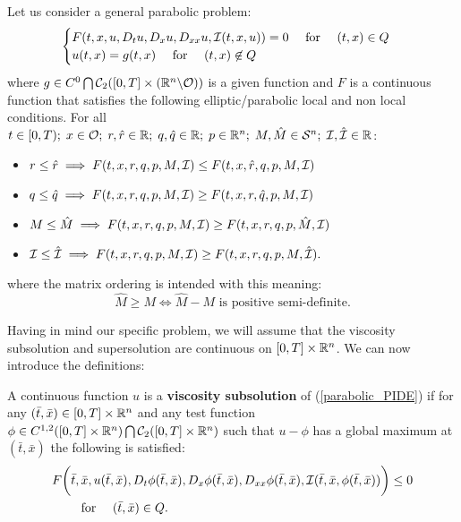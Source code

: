 Let us consider a general parabolic problem:
\begin{equation}\label{parabolic_PIDE}
\begin{cases}
F(t,x,u,D_t u,D_x u,D_{xx}u,\mathcal{I}(t,x,u)) = 0 \quad \mbox{ for } \quad (t,x) \in Q \\
u(t,x) = g(t,x) \quad \mbox{ for } \quad (t,x) \not \in Q
\end{cases}
\end{equation}
where $g \in C^0 \bigcap \mathcal{C}_2([0,T] \times (\mathbb{R}^n \backslash \mathcal{O}))$ is a given function and 
$F$ is a continuous function that satisfies the following elliptic/parabolic local and non local conditions. 
For all $t\in [0,T); \; x \in \mathcal{O}; \; r,\hat r \in \mathbb{R}; \; q,\hat q \in \mathbb{R}; \; 
p \in \mathbb{R}^n; \; M,\hat M \in \mathcal{S}^n; \; \mathcal{I}, \hat {\mathcal{I}} \in \mathbb{R}$:
\begin{itemize}
 \item $r \leq \hat r \; \Longrightarrow  \; F(t,x,r,q,p,M,\mathcal{I}) \leq F(t,x,\hat r,q,p,M,\mathcal{I}) $
 \item $q \leq \hat q \; \Longrightarrow  \; F(t,x,r,q,p,M,\mathcal{I}) \geq F(t,x,r,\hat q,p,M,\mathcal{I}) $
 \item $M \leq \hat M \; \Longrightarrow  \; F(t,x,r,q,p,M,\mathcal{I}) \geq F(t,x,r,q,p,\hat M,\mathcal{I}) $
 \item $\mathcal{I} \leq \hat {\mathcal{I}} \; \Longrightarrow  \; F(t,x,r,q,p,M,\mathcal{I}) \geq F(t,x,r,q,p,M,\hat {\mathcal{I}}). $
\end{itemize}
where the matrix ordering is intended with this meaning:
$$ \hat M \geq M \Leftrightarrow \hat M - M \mbox{ is positive semi-definite.} $$

Having in mind our specific problem, we will assume that the viscosity subsolution and supersolution are continuous on $[0,T]\times \mathbb{R}^n$.
We can now introduce the definitions:
\begin{Definition}
 A continuous function $u$ is a \textbf{viscosity subsolution} of (\ref{parabolic_PIDE})
 if for any $(\bar t, \bar x) \in [0,T]\times \mathbb{R}^n$ and any test function $ \phi \in C^{1,2}([0,T] \times \mathbb{R}^n) \bigcap \mathcal{C}_2([0,T] \times \mathbb{R}^n)$ 
 such that $u-\phi$ has a global maximum at $(\bar t,\bar x)$ the following is satisfied:
\begin{align}\label{subsolution}
 & F\biggl( \bar t,\bar x,u(\bar t,\bar x),D_t \phi(\bar t,\bar x), D_x \phi(\bar t,\bar x),D_{xx}\phi(\bar t,\bar x),\mathcal{I}(\bar t, \bar x,\phi(\bar t,\bar x))\biggr) \leq 0 \\ \nonumber
 &  \quad \quad \mbox{ for } \quad (\bar t,\bar x) \in Q.
\end{align}
\end{Definition}

